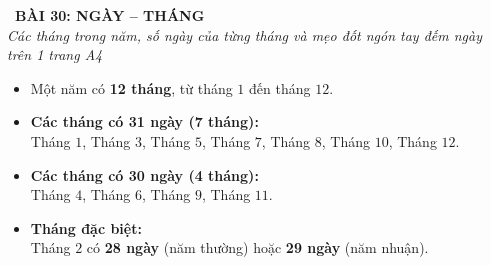 \documentclass[11pt,a4paper]{article}
\begin{document}
\begin{tcolorbox}[
  enhanced,
  colback=violet!8!white,
  colframe=violet!70!black,
  arc=3mm, boxrule=1.2pt,
  left=3mm, right=3mm, top=2mm, bottom=2mm,
  halign=center
]
  {\LARGE\bfseries\color{violet!90!black}\faBookmark\ BÀI 30: NGÀY -- THÁNG}\\[1mm]
  {\itshape\footnotesize\color{black!75} Các tháng trong năm, số ngày của từng tháng và mẹo đốt ngón tay đếm ngày trên 1 trang A4}
\end{tcolorbox}

\vspace{-2mm}

\noindent
\begin{minipage}[t]{0.49\textwidth}\vspace{0pt}
\begin{tcolorbox}[
  enhanced,
  colback=violet!4!white,
  colframe=violet!75!black,
  arc=2mm, boxrule=0.8pt,
  left=2mm, right=2mm, top=1.8mm, bottom=1.8mm,
  title={\footnotesize\bfseries\color{white}\faKey\ 1. Các tháng trong năm}
]
{\footnotesize
\begin{itemize}\setlength{\itemsep}{1pt}\setlength{\leftskip}{-2.5mm}
  \item Một năm có \textbf{12 tháng}, từ tháng $1$ đến tháng $12$.
  \item \textbf{Các tháng có 31 ngày (7 tháng):}\\
  Tháng $1$, Tháng $3$, Tháng $5$, Tháng $7$, Tháng $8$, Tháng $10$, Tháng $12$.
  \item \textbf{Các tháng có 30 ngày (4 tháng):}\\
  Tháng $4$, Tháng $6$, Tháng $9$, Tháng $11$.
  \item \textbf{Tháng đặc biệt:}\\
  Tháng $2$ có \textbf{28 ngày} (năm thường) hoặc \textbf{29 ngày} (năm nhuận).
\end{itemize}
}
\end{tcolorbox}
\end{minipage}
\hfill
\end{document}
